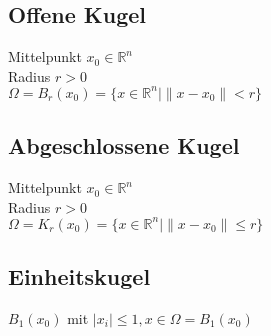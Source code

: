 \documentclass[german]{latex4ei/latex4ei_sheet}
\begin{document}
\begin{sectionbox}
	\subsection*{Offene Kugel}
	Mittelpunkt $x_0 \in \mathbb{R}^n$\\
	Radius $r > 0$\\
	$\Omega=B_r(x_0)=\{x \in \mathbb{R}^n|\|x-x_0\|<r\}$\\
	
	\subsection*{Abgeschlossene Kugel}
	Mittelpunkt $x_0 \in \mathbb{R}^n$\\
	Radius $r > 0$\\
	$\Omega=K_r(x_0)=\{x \in \mathbb{R}^n|\|x-x_0\|\le r\}$\\
	
	\subsection*{Einheitskugel}
	$B_1(x_0)$ mit $|x_i|\le 1, x\in \Omega=B_1(x_0)$
\end{sectionbox}
\end{document}

